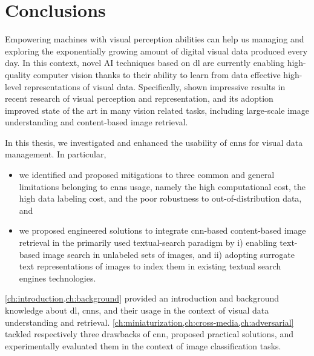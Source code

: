 
\chapter{Conclusions}
\label{ch:conclusion}

Empowering machines with visual perception abilities can help us managing and exploring the exponentially growing amount of digital visual data produced every day.
In this context, novel AI techniques based on \acrlong{dl} are currently enabling high-quality computer vision thanks to their ability to learn from data effective high-level representations of visual data.
Specifically,  shown impressive results in recent research of visual perception and representation, and its adoption improved state of the art in many vision related tasks, including large-scale image understanding and content-based image retrieval.

In this thesis, we investigated and enhanced the usability of \glspl{cnn} for visual data management.
In particular,
\begin{itemize}
    \item we identified and proposed mitigations to three common and general limitations belonging to \glspl{cnn} usage, namely the high computational cost, the high data labeling cost, and the poor robustness to out-of-distribution data, and
    \item we proposed engineered solutions to integrate \gls{cnn}-based content-based image retrieval in the primarily used textual-search paradigm by %
i) enabling text-based image search in unlabeled sets of images, and %
ii) adopting surrogate text representations of images to index them in existing textual search engines technologies.
\end{itemize}

\ref{ch:introduction,ch:background} provided an introduction and background knowledge about \acrlong{dl}, \glspl{cnn}, and their usage in the context of visual data understanding and retrieval.
\ref{ch:miniaturization,ch:cross-media,ch:adversarial} tackled respectively three drawbacks of \gls{cnn}, proposed practical solutions, and experimentally evaluated them in the context of image classification tasks.

